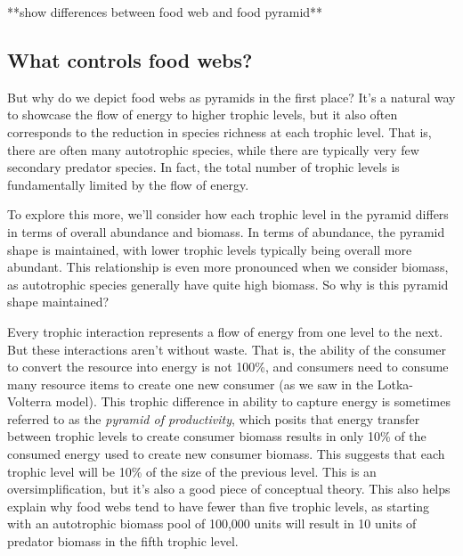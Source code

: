 \documentclass[12pt]{article}
\begin{document}
**show differences between food web and food pyramid**









\bigskip
\subsection*{What controls food webs?}

But why do we depict food webs as pyramids in the first place? It's a natural way to showcase the flow of energy to higher trophic levels, but it also often corresponds to the reduction in species richness at each trophic level. That is, there are often many autotrophic species, while there are typically very few secondary predator species. In fact, the total number of trophic levels is fundamentally limited by the flow of energy. 

To explore this more, we'll consider how each trophic level in the pyramid differs in terms of overall abundance and biomass. In terms of abundance, the pyramid shape is maintained, with lower trophic levels typically being overall more abundant. This relationship is even more pronounced when we consider biomass, as autotrophic species generally have quite high biomass. So why is this pyramid shape maintained?

Every trophic interaction represents a flow of energy from one level to the next. But these interactions aren't without waste. That is, the ability of the consumer to convert the resource into energy is not 100\%, and consumers need to consume many resource items to create one new consumer (as we saw in the Lotka-Volterra model). This trophic difference in ability to capture energy is sometimes referred to as the \textit{pyramid of productivity}, which posits that energy transfer between trophic levels to create consumer biomass results in only 10\% of the consumed energy used to create new consumer biomass. This suggests that each trophic level will be 10\% of the size of the previous level. This is an oversimplification, but it's also a good piece of conceptual theory. This also helps explain why food webs tend to have fewer than five trophic levels, as starting with an autotrophic biomass pool of 100,000 units will result in 10 units of predator biomass in the fifth trophic level.
\end{document}
